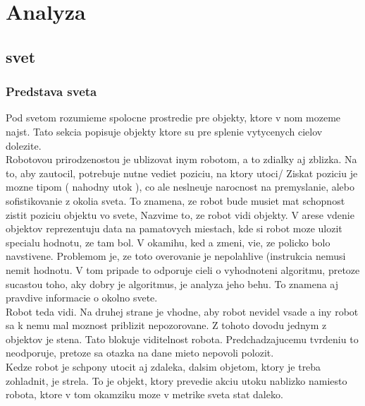 \documentclass[a4paper,11pt,final]{report}
\begin{document}
\chapter{Analyza}
\section{svet}
\subsection{Predstava sveta}
Pod svetom rozumieme spolocne prostredie pre objekty, ktore v nom mozeme najst. %
Tato sekcia popisuje objekty ktore su pre splenie vytycenych cielov dolezite. \\
Robotovou prirodzenostou je ublizovat inym robotom, a to zdialky aj zblizka. Na to, aby zautocil, potrebuje nutne vediet poziciu, na ktory utoci/ Ziskat poziciu je mozne tipom ( nahodny utok ), co ale neslneuje narocnost na premyslanie, alebo sofistikovanie z okolia sveta. To znamena, ze robot bude musiet mat schopnost zistit poziciu objektu vo svete, Nazvime to, ze robot vidi objekty. V arese vdenie objektov reprezentuju data na pamatovych miestach, kde si robot moze ulozit specialu hodnotu, ze tam bol. V okamihu, ked a zmeni, vie, ze policko bolo navstivene. Problemom je, ze toto overovanie je nepolahlive (instrukcia nemusi nemit hodnotu. V tom pripade to odporuje cieli o vyhodnoteni algoritmu, pretoze sucastou toho, aky dobry je algoritmus, je analyza jeho behu. To znamena aj pravdive informacie o okolno svete. \\ %
Robot teda vidi. Na druhej strane je vhodne, aby robot nevidel vsade a iny robot sa k nemu mal moznost priblizit nepozorovane.%
Z tohoto dovodu jednym z objektov je stena. Tato blokuje viditelnost robota. Predchadzajucemu tvrdeniu to neodporuje, pretoze sa otazka na dane mieto nepovoli polozit.\\%
Kedze robot je schpony utocit aj zdaleka, dalsim objetom, ktory je treba zohladnit, je strela. To je objekt, ktory prevedie akciu utoku nablizko namiesto robota, ktore v tom okamziku moze v metrike sveta stat daleko.
\end{document}
